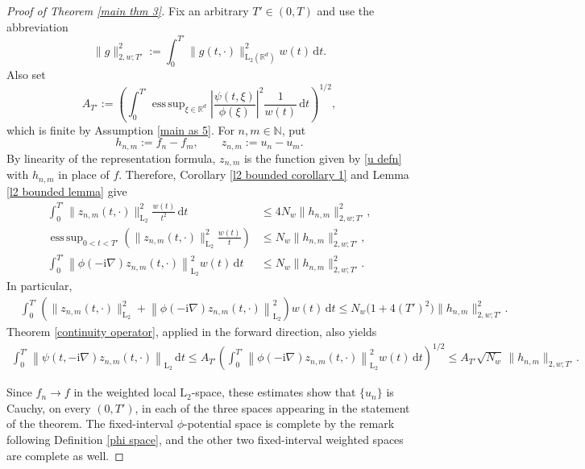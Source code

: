 \documentclass[11pt,reqno]{amsart}
\theoremstyle{definition}
\theoremstyle{remark}
\newcommand\bN{\mathbb{N}}
\newcommand\bR{\mathbb{R}}
\DeclareMathOperator*{\esssup}{ess\,sup}
\numberwithin{equation}{section}
\begin{document}
\begin{proof}[Proof of Theorem \ref{main thm 3}]
Fix an arbitrary $T'\in(0,T)$ and use the abbreviation
$$
\|g\|_{2,w;T'}^2
:=
\int_0^{T'}\|g(t,\cdot)\|_{\mathrm L_2(\bR^d)}^2
w(t)\,\mathrm{d}t.
$$
Also set
$$
A_{T'}
:=
\left(
\int_0^{T'}
\esssup_{\xi\in\bR^d}
\left|\frac{\psi(t,\xi)}{\phi(\xi)}\right|^2
\frac{1}{w(t)}\,\mathrm{d}t
\right)^{1/2},
$$
which is finite by Assumption \ref{main as 5}. For $n,m\in\bN$, put
$$
h_{n,m}:=f_n-f_m,
\qquad
z_{n,m}:=u_n-u_m.
$$
By linearity of the representation formula, $z_{n,m}$ is the function
given by \eqref{u defn} with $h_{n,m}$ in place of $f$. Therefore,
Corollary \ref{l2 bounded corollary 1} and Lemma
\ref{l2 bounded lemma} give
\begin{align*}
\int_0^{T'}\|z_{n,m}(t,\cdot)\|_{\mathrm L_2}^2
\frac{w(t)}{t^2}\,\mathrm{d}t
&\leq
4N_w\|h_{n,m}\|_{2,w;T'}^2,\\
\esssup_{0<t<T'}
\left(
\|z_{n,m}(t,\cdot)\|_{\mathrm L_2}^2
\frac{w(t)}{t}
\right)
&\leq
N_w\|h_{n,m}\|_{2,w;T'}^2,\\
\int_0^{T'}
\left\|\phi(-\mathrm{i}\nabla)z_{n,m}(t,\cdot)\right\|_{\mathrm L_2}^2
w(t)\,\mathrm{d}t
&\leq
N_w\|h_{n,m}\|_{2,w;T'}^2.
\end{align*}
In particular,
\begin{align*}
&\int_0^{T'}
\left(
\|z_{n,m}(t,\cdot)\|_{\mathrm L_2}^2
+
\left\|\phi(-\mathrm{i}\nabla)z_{n,m}(t,\cdot)\right\|_{\mathrm L_2}^2
\right)w(t)\,\mathrm{d}t\leq
N_w\bigl(1+4(T')^2\bigr)\|h_{n,m}\|_{2,w;T'}^2.
\end{align*}
Theorem \ref{continuity operator}, applied in the forward direction,
also yields
\begin{align*}
\int_0^{T'}
\left\|
\psi(t,-\mathrm{i}\nabla)z_{n,m}(t,\cdot)
\right\|_{\mathrm L_2}\,\mathrm{d}t
\leq
A_{T'}
\left(
\int_0^{T'}
\left\|\phi(-\mathrm{i}\nabla)z_{n,m}(t,\cdot)\right\|_{\mathrm L_2}^2
w(t)\,\mathrm{d}t
\right)^{1/2}\leq
A_{T'}\sqrt{N_w}\,
\|h_{n,m}\|_{2,w;T'}.
\end{align*}

Since $f_n\to f$ in the weighted local $\mathrm L_2$-space, these
estimates show that $\{u_n\}$ is Cauchy, on every $(0,T')$, in each of
the three spaces appearing in the statement of the theorem. The
fixed-interval $\phi$-potential space is complete by the remark
following Definition \ref{phi space}, and the other two fixed-interval
weighted spaces are complete as well.


\end{proof}
\end{document}
